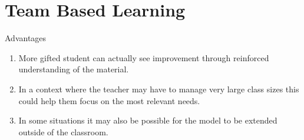 \section{Team Based Learning}

Advantages
\begin{enumerate}
\item More gifted student can actually see improvement through reinforced 
understanding of the material.
\item In a context where the teacher may have to manage very large class sizes
this could help them focus on the most relevant needs.
\item In some situations it may also be possible for the model to be extended
outside of the classroom.
\end{enumerate}
